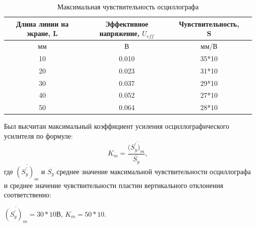 \begin{center}
\begin{table}[h!]
\centering
\caption{Максимальная чувствительность осциллографа}
\label{tabl:3}
\begin{tabular}{|c|c|c|c|}
\hline
\begin{minipage}{5cm}
    Длина линии на экране, L
\end{minipage} &
\begin{minipage}{5cm}
    Эффективное напряжение, $U_{eff}$
\end{minipage} &
\begin{minipage}{5cm}
    Чувствительность, S
\end{minipage}\\
\hline
мм&В&мм/В\\
\hline
10  &  0.010 &  35*10 \\
20  &  0.023  &  31*10\\
30  &  0.037  &  29*10 \\
40  &  0.052  &  27*10 \\
50  &  0.064  &  28*10 \\
\hline
\end{tabular}
\end{table}
\end{center}
Был высчитан максимальный коэффициент усиления осциллографического усилителя по формуле:
\begin{equation}
\label{eq:6}
   K_m=\frac{(\overline{S^{'}_y)_m}}{\overline{S^{}_y}},
\end{equation}
где $\overline{(S^{'}_y)_m}$ и $\overline{S^{}_y}$ среднее значение максимальной чувствительности осциллографа и среднее значение чувствительности пластин вертикального отклонения соответственно: 
\par$\overline{(S^{'}_y)_m}=30*10$В, $K_m=50*10$.

